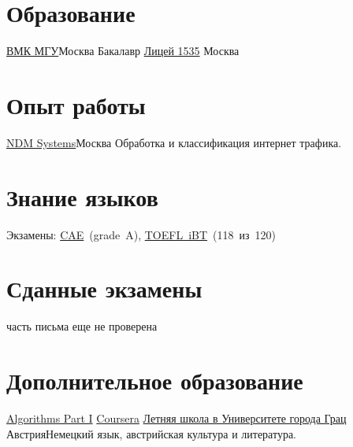 \documentclass[11pt,a4paper,roman]{moderncv}
\begin{document}
\makecvtitle

\section{Образование}
        {\href{http://cs.msu.ru/}{ВМК МГУ}}{Москва}
        {Бакалавр}
        {}
        {\href{http://liceum1535.ru/}{Лицей 1535}}
        {Москва}
        {}{}
\section{Опыт работы}
        {\href{http://www.ndmsystems.com}{NDM Systems}}{Москва}
        {}{Обработка и классификация интернет трафика.}

\section{Знание языков}
  {Экзамены:
    \href{https://ru.wikipedia.org/wiki/Certificate_in_Advanced_English}{CAE}~(grade~A),
    \href{https://ru.wikipedia.org/wiki/TOEFL}{TOEFL~iBT}~(118~из~120)
  }

\section{Сданные экзамены}
        {}{}{часть письма еще не проверена}

\section{Дополнительное образование}
        {\href{https://www.coursera.org/course/algs4partI}{Algorithms Part I}}
        {\href{https://www.coursera.org/course/algs4partI}{Coursera}}
        {}{}{}
        {\href{http://treffpunktsprachen.uni-graz.at/en/}{Летняя школа в Университете города Грац}}
        {Австрия}{}{Немецкий язык, австрийская культура и литература.}
\end{document}
